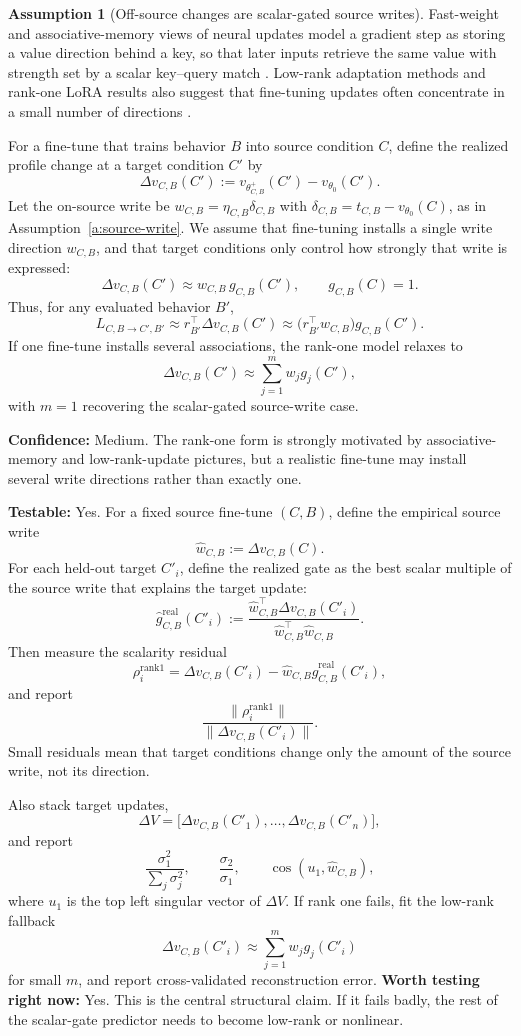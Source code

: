 \documentclass[11pt]{article}
\theoremstyle{definition}
\theoremstyle{definition}
\theoremstyle{assumptionstyle}
\newtheorem{assumption}{Assumption}[section]
\begin{document}
\begin{assumption}[Off-source changes are scalar-gated source writes]
\label{a:rank-one-gated-write}
Fast-weight and associative-memory views of neural updates model a gradient step
as storing a value direction behind a key, so that later inputs retrieve the same
value with strength set by a scalar key--query match
\cite{ba2016fastweights,schlag2021fwp,geva2021}. Low-rank adaptation methods and
rank-one LoRA results also suggest that fine-tuning updates often concentrate in
a small number of directions \cite{hu2021,ward2025}.

For a fine-tune that trains behavior \(B\) into source condition \(C\), define
the realized profile change at a target condition \(C'\) by
\[
\Delta v_{C,B}(C')
:=
v_{\theta^+_{C,B}}(C')
-
v_{\theta_0}(C').
\]
Let the on-source write be \(w_{C,B}=\eta_{C,B}\delta_{C,B}\) with \(\delta_{C,B}=t_{C,B}-v_{\theta_0}(C)\), as in Assumption~\ref{a:source-write}.
We assume that fine-tuning installs a single write direction \(w_{C,B}\), and
that target conditions only control how strongly that write is expressed:
\[
\Delta v_{C,B}(C')
\approx
w_{C,B}\,g_{C,B}(C'),
\qquad
g_{C,B}(C)=1.
\]
Thus, for any evaluated behavior \(B'\),
\[
L_{C,B\to C',B'}
\approx
r_{B'}^\top \Delta v_{C,B}(C')
\approx
\big(r_{B'}^\top w_{C,B}\big)
g_{C,B}(C').
\]
If one fine-tune installs several associations, the rank-one model relaxes to
\[
\Delta v_{C,B}(C')
\approx
\sum_{j=1}^m w_j g_j(C'),
\]
with \(m=1\) recovering the scalar-gated source-write case.

\textbf{Confidence:} Medium. The rank-one form is strongly motivated by
associative-memory and low-rank-update pictures, but a realistic fine-tune may
install several write directions rather than exactly one.

\textbf{Testable:} Yes. For a fixed source fine-tune \((C,B)\), define
the empirical source write
\[
\widehat w_{C,B}
:=
\Delta v_{C,B}(C).
\]
For each held-out target \(C'_i\), define the realized gate as the best scalar
multiple of the source write that explains the target update:
\[
\widehat g^{\mathrm{real}}_{C,B}(C'_i)
:=
\frac{
\widehat w_{C,B}^{\top}
\Delta v_{C,B}(C'_i)
}{
\widehat w_{C,B}^{\top}
\widehat w_{C,B}
}.
\]
Then measure the scalarity residual
\[
\rho_i^{\mathrm{rank1}}
=
\Delta v_{C,B}(C'_i)
-
\widehat w_{C,B}
\widehat g^{\mathrm{real}}_{C,B}(C'_i),
\]
and report
\[
\frac{
\|\rho_i^{\mathrm{rank1}}\|
}{
\|\Delta v_{C,B}(C'_i)\|
}.
\]
Small residuals mean that target conditions change only the amount of the source
write, not its direction.

Also stack target updates,
\[
\Delta V
=
\big[
\Delta v_{C,B}(C'_1),
\dots,
\Delta v_{C,B}(C'_n)
\big],
\]
and report
\[
\frac{\sigma_1^2}{\sum_j\sigma_j^2},
\qquad
\frac{\sigma_2}{\sigma_1},
\qquad
\cos(u_1,\widehat w_{C,B}),
\]
where \(u_1\) is the top left singular vector of \(\Delta V\). If rank one fails,
fit the low-rank fallback
\[
\Delta v_{C,B}(C'_i)
\approx
\sum_{j=1}^m w_j g_j(C'_i)
\]
for small \(m\), and report cross-validated reconstruction error.
\textbf{Worth testing right now:} Yes. This is the central structural
claim. If it fails badly, the rest of the scalar-gate predictor needs to become
low-rank or nonlinear.
\end{assumption}
\end{document}
